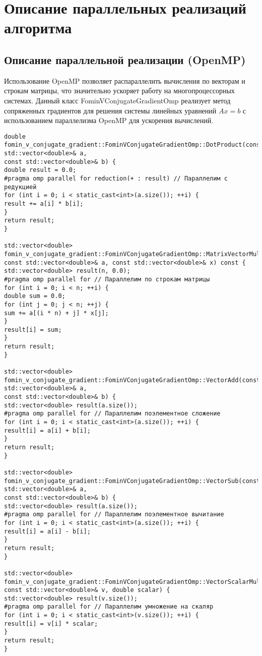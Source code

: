 \documentclass[12pt]{article}
\begin{document}
\section{Описание параллельных реализаций алгоритма}

\subsection{Описание параллельной реализации (OpenMP)}

\hspace*{1.35em}Использование OpenMP позволяет распараллелить вычисления по векторам и строкам матрицы, что значительно ускоряет работу на многопроцессорных системах.
Данный класс FominVConjugateGradientOmp реализует метод сопряженных градиентов для решения системы линейных уравнений \( Ax = b \) с использованием параллелизма OpenMP для ускорения вычислений.

\begin{verbatim}
double fomin_v_conjugate_gradient::FominVConjugateGradientOmp::DotProduct(const std::vector<double>& a,
const std::vector<double>& b) {
double result = 0.0;
#pragma omp parallel for reduction(+ : result) // Параллелим с редукцией
for (int i = 0; i < static_cast<int>(a.size()); ++i) {
result += a[i] * b[i];
}
return result;
}

std::vector<double> fomin_v_conjugate_gradient::FominVConjugateGradientOmp::MatrixVectorMultiply(
const std::vector<double>& a, const std::vector<double>& x) const {
std::vector<double> result(n, 0.0);
#pragma omp parallel for // Параллелим по строкам матрицы
for (int i = 0; i < n; ++i) {
double sum = 0.0;
for (int j = 0; j < n; ++j) {
sum += a[(i * n) + j] * x[j];
}
result[i] = sum;
}
return result;
}

std::vector<double> fomin_v_conjugate_gradient::FominVConjugateGradientOmp::VectorAdd(const std::vector<double>& a,
const std::vector<double>& b) {
std::vector<double> result(a.size());
#pragma omp parallel for // Параллелим поэлементное сложение
for (int i = 0; i < static_cast<int>(a.size()); ++i) {
result[i] = a[i] + b[i];
}
return result;
}

std::vector<double> fomin_v_conjugate_gradient::FominVConjugateGradientOmp::VectorSub(const std::vector<double>& a,
const std::vector<double>& b) {
std::vector<double> result(a.size());
#pragma omp parallel for // Параллелим поэлементное вычитание
for (int i = 0; i < static_cast<int>(a.size()); ++i) {
result[i] = a[i] - b[i];
}
return result;
}

std::vector<double> fomin_v_conjugate_gradient::FominVConjugateGradientOmp::VectorScalarMultiply(
const std::vector<double>& v, double scalar) {
std::vector<double> result(v.size());
#pragma omp parallel for // Параллелим умножение на скаляр
for (int i = 0; i < static_cast<int>(v.size()); ++i) {
result[i] = v[i] * scalar;
}
return result;
}
\end{verbatim}
\end{document}
